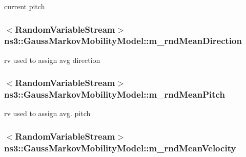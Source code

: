 current pitch 

\subsubsection[{\texorpdfstring{m\+\_\+rnd\+Mean\+Direction}{m_rndMeanDirection}}]{$<${\bf Random\+Variable\+Stream}$>$ ns3\+::\+Gauss\+Markov\+Mobility\+Model\+::m\+\_\+rnd\+Mean\+Direction\hspace{0.3cm}{\ttfamily [private]}}\hypertarget{classns3_1_1GaussMarkovMobilityModel_aca9f735142434714b98f842867219578}{}\label{classns3_1_1GaussMarkovMobilityModel_aca9f735142434714b98f842867219578}


rv used to assign avg direction 

\subsubsection[{\texorpdfstring{m\+\_\+rnd\+Mean\+Pitch}{m_rndMeanPitch}}]{$<${\bf Random\+Variable\+Stream}$>$ ns3\+::\+Gauss\+Markov\+Mobility\+Model\+::m\+\_\+rnd\+Mean\+Pitch\hspace{0.3cm}{\ttfamily [private]}}\hypertarget{classns3_1_1GaussMarkovMobilityModel_a9b24b63f6d9177ace0f90e3b76e49a27}{}\label{classns3_1_1GaussMarkovMobilityModel_a9b24b63f6d9177ace0f90e3b76e49a27}


rv used to assign avg. pitch 

\subsubsection[{\texorpdfstring{m\+\_\+rnd\+Mean\+Velocity}{m_rndMeanVelocity}}]{$<${\bf Random\+Variable\+Stream}$>$ ns3\+::\+Gauss\+Markov\+Mobility\+Model\+::m\+\_\+rnd\+Mean\+Velocity\hspace{0.3cm}{\ttfamily [private]}}\hypertarget{classns3_1_1GaussMarkovMobilityModel_a9b9673143fb0414e80eeb54587fd412d}{}\label{classns3_1_1GaussMarkovMobilityModel_a9b9673143fb0414e80eeb54587fd412d}


